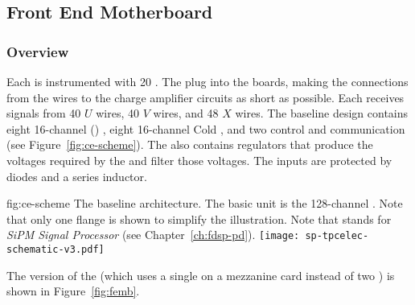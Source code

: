 
\subsection{Front End Motherboard}
\label{sec:fdsp-tpcelec-design-femb}


\subsubsection{Overview}
\label{sec:fdsp-tpcelec-design-femb-overview}

Each  is instrumented with \num{20} .
The  plug into the   boards, making the connections from the wires to the charge amplifier circuits as short as possible.
Each  receives signals from \num{40} $U$ wires, \num{40} $V$ wires, and \num{48} $X$ wires.
The baseline  design contains eight \num{16}-channel  () , eight \num{16}-channel Cold  , and two  control and communication  (see Figure~\ref{fig:ce-scheme}).
The  also contains regulators that produce the voltages required by the  and 
filter those voltages.
The  inputs are protected by diodes and a series inductor.

\begin{dunefigure}
{fig:ce-scheme}
{The baseline  architecture. The basic unit is the \num{128}-channel . Note that only one  flange is shown to simplify the illustration. Note that  stands for \textit{SiPM Signal Processor} (see Chapter~\ref{ch:fdsp-pd}).}
\texttt{[image: sp-tpcelec-schematic-v3.pdf]}
\end{dunefigure}

The  version of the  (which uses a single  on a mezzanine card instead of two  ) is shown in Figure~\ref{fig:femb}.

